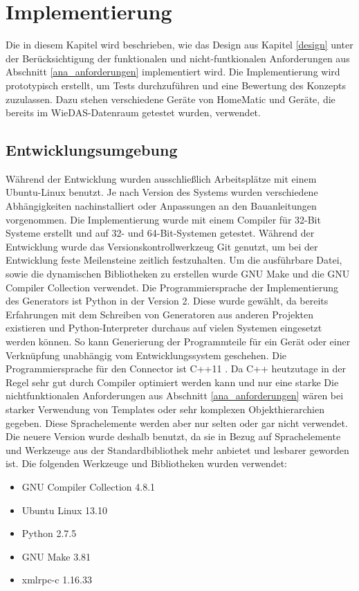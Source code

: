 \chapter{Implementierung}
\label{implementierung}

Die in diesem Kapitel wird beschrieben, wie das Design aus Kapitel \ref{design}
unter der Berücksichtigung der funktionalen und nicht-funtkionalen Anforderungen
aus Abschnitt \ref{ana_anforderungen} implementiert wird.
Die Implementierung wird prototypisch erstellt, um Tests durchzuführen und eine
Bewertung des Konzepts zuzulassen.
Dazu stehen verschiedene Geräte von HomeMatic und Geräte, die bereits im WieDAS-Datenraum
getestet wurden, verwendet.

\section{Entwicklungsumgebung}
\label{impl_entw}
Während der Entwicklung wurden ausschließlich Arbeitsplätze mit einem Ubuntu-Linux \cite{ubuntu}
benutzt.
Je nach Version des Systems wurden verschiedene Abhängigkeiten nachinstalliert oder Anpassungen
an den Bauanleitungen vorgenommen.
Die Implementierung wurde mit einem Compiler für 32-Bit Systeme erstellt und auf 32- und 64-Bit-Systemen
getestet.
Während der Entwicklung wurde das Versionskontrollwerkzeug Git \cite{git} genutzt, um bei der Entwicklung
feste Meilensteine zeitlich festzuhalten.
Um die ausführbare Datei, sowie die dynamischen Bibliotheken zu erstellen wurde GNU Make \cite{make} und
die GNU Compiler Collection \cite{gcc} verwendet.
Die Programmiersprache der Implementierung des Generators ist Python \cite{python} in der Version 2.
Diese wurde gewählt, da bereits Erfahrungen mit dem Schreiben von Generatoren aus anderen Projekten existieren
und Python-Interpreter durchaus auf vielen Systemen eingesetzt werden können.
So kann Generierung der Programmteile für ein Gerät oder einer Verknüpfung unabhängig vom Entwicklungssystem
geschehen.
Die Programmiersprache für den Connector ist C++11 \cite{c++11}.
Da C++ heutzutage in der Regel sehr gut durch Compiler optimiert werden kann und nur eine starke
Die nichtfunktionalen Anforderungen aus Abschnitt \ref{ana_anforderungen} wären bei
starker Verwendung von Templates oder sehr komplexen Objekthierarchien gegeben.
Diese Sprachelemente werden aber nur selten oder gar nicht verwendet.
Die neuere Version wurde deshalb benutzt, da sie in Bezug auf Sprachelemente und Werkzeuge aus
der Standardbibliothek mehr anbietet und lesbarer geworden ist.
Die folgenden Werkzeuge und Bibliotheken wurden verwendet:
\begin{itemize}
\item GNU Compiler Collection 4.8.1
\item Ubuntu Linux 13.10
\item Python 2.7.5
\item GNU Make 3.81
\item xmlrpc-c 1.16.33
\end{itemize}

